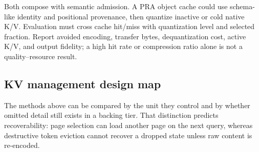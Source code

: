 Both compose with semantic admission. A PRA object cache could use schema-like identity and
positional provenance, then quantize inactive or cold native K/V. Evaluation must cross cache
hit/miss with quantization level and selected fraction. Report avoided encoding, transfer
bytes, dequantization cost, active K/V, and output fidelity; a high hit rate or compression
ratio alone is not a quality--resource result.

\subsection{KV management design map}

The methods above can be compared by the unit they control and by whether omitted detail
still exists in a backing tier. That distinction predicts recoverability: page selection
can load another page on the next query, whereas destructive token eviction cannot recover
a dropped state unless raw content is re-encoded.

